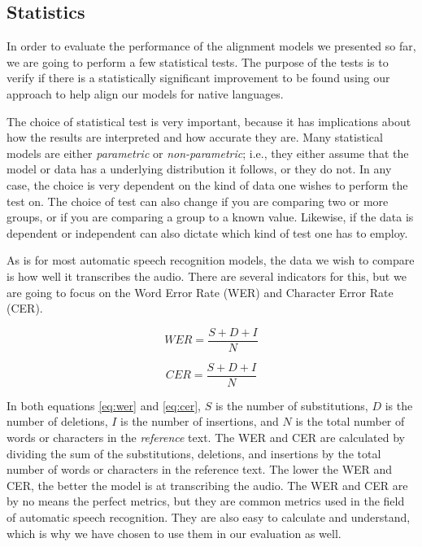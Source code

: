 \subsection{Statistics}

In order to evaluate the performance of the alignment models we presented so far, we are going to perform a few statistical tests. The purpose of the tests is to verify if there is a statistically significant improvement to be found using our approach to help align our models for native languages.

The choice of statistical test is very important, because it has implications about how the results are interpreted and how accurate they are. Many statistical models are either \textit{parametric} or \textit{non-parametric}; i.e., they either assume that the model or data has a underlying distribution it follows, or they do not. In any case, the choice is very dependent on the kind of data one wishes to perform the test on. The choice of test can also change if you are comparing two or more groups, or if you are comparing a group to a known value. Likewise, if the data is dependent or independent can also dictate which kind of test one has to employ.\cite{STATS}

As is for most automatic speech recognition models, the data we wish to compare is how well it transcribes the audio. There are several indicators for this, but we are going to focus on the Word Error Rate (WER) and Character Error Rate (CER). 

\begin{equation}
    WER = \frac{S + D + I}{N}
    \label{eq:wer}
\end{equation}

\begin{equation}
    CER = \frac{S + D + I}{N}
    \label{eq:cer}
\end{equation}

In both equations \ref{eq:wer} and \ref{eq:cer}, $S$ is the number of substitutions, $D$ is the number of deletions, $I$ is the number of insertions, and $N$ is the total number of words or characters in the \textit{reference} text. The WER and CER are calculated by dividing the sum of the substitutions, deletions, and insertions by the total number of words or characters in the reference text. The lower the WER and CER, the better the model is at transcribing the audio. The WER and CER are by no means the perfect metrics, but they are common metrics used in the field of automatic speech recognition. They are also easy to calculate and understand, which is why we have chosen to use them in our evaluation as well.

